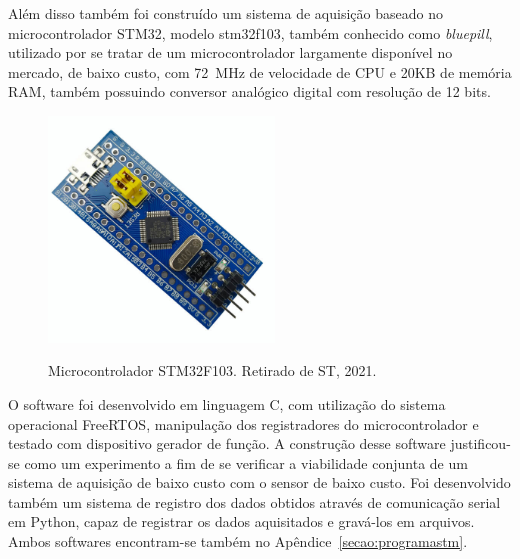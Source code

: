 \documentclass[
	12pt,				
	oneside,			
	a4paper,			
	english,			
	brazil,			
	]{abntex2ppgsi}
\begin{document}
Além disso também foi construído um sistema de aquisição baseado no microcontrolador STM32, modelo stm32f103, também conhecido como \textit{bluepill}, utilizado por se tratar de um microcontrolador largamente disponível no mercado, de baixo custo, com \SI{72}{\mega\hertz} de velocidade de CPU e 20KB de memória RAM, também possuindo conversor analógico digital com resolução de 12 bits. 


\begin{figure}[H]
\centering
\caption {Microcontrolador STM32F103. Retirado de ST, 2021.}
\includegraphics[width=\textwidth,height=60mm,keepaspectratio]{stm32}
\label{stm32}
\end{figure}

O software foi desenvolvido em linguagem C, com utilização do sistema operacional FreeRTOS, manipulação dos registradores do microcontrolador e testado com dispositivo gerador de função. A construção desse software justificou-se como um experimento a fim de se verificar a viabilidade conjunta de um sistema de aquisição de baixo custo com o sensor de baixo custo. Foi desenvolvido também um sistema de registro dos dados obtidos através de comunicação serial em Python, capaz de registrar os dados aquisitados e gravá-los em arquivos. Ambos softwares encontram-se também no Apêndice~\ref{secao:programastm}.

\end{document}

